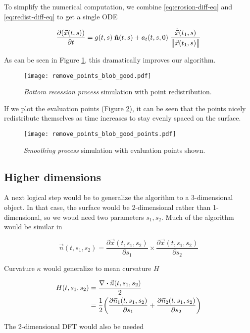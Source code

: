 To simplify the numerical computation, we combine \ref{eq:erosion-diff-eq} and \ref{eq:redist-diff-eq} to get a single ODE

\begin{equation}
  \frac{\partial (\vec{x}(t, s))}{\partial t} = g(t, s) \; \bhat{n}(t, s) + a_t(t, s, 0) \; \frac{\dot{\vec{x}}(t_1, s)}{\norm{\dot{\vec{x}}(t_1, s)}}
\end{equation}

As can be seen in Figure \ref{fig:remove-points-blob-good}, this dramatically improves our algorithm.

\begin{figure}[H]
    \begin{center}
      \texttt{[image: remove\_points\_blob\_good.pdf]}
    \end{center}
  \vspace{-.2in} %
  \caption{\label{fig:remove-points-blob-good}\textit{Bottom recession process} simulation with point redistribution.}
\end{figure}

If we plot the evaluation points (Figure \ref{fig:remove-points-blob-good-points}), it can be seen that the points nicely redistribute themselves as time increases to stay evenly spaced on the surface.

\begin{figure}[H]
    \begin{center}
      \texttt{[image: remove\_points\_blob\_good\_points.pdf]}
    \end{center}
  \vspace{-.2in} %
  \caption{\label{fig:remove-points-blob-good-points}\textit{Smoothing process} simulation with evaluation points shown.}
\end{figure}

\subsection*{Higher dimensions}

A next logical step would be to generalize the algorithm to a 3-dimensional object. In that case, the surface would be 2-dimensional rather than 1-dimensional, so we woud need two parameters $s_1, s_2$. Much of the algorithm would be similar in 

\[
  \vec{n}(t, s_1, s_2) = \frac{\partial \vec{x}(t, s_1, s_2)}{\partial s_1} \times \frac{\partial \vec{x}(t, s_1, s_2)}{\partial s_2} 
\]

Curvature $\kappa$ would generalize to mean curvature $H$

\begin{align*}
  H(t, s_1, s_2)& = \frac{\nabla \boldsymbol{\cdot} \vec{n}(t, s_1, s_2)}{2}\\
  &= \frac{1}{2} \paren{\frac{\partial \vec{n}_1(t, s_1, s_2)}{\partial s_1} + \frac{\partial \vec{n}_2(t, s_1, s_2)}{\partial s_2}}
\end{align*}

The 2-dimensional DFT would also be needed 

